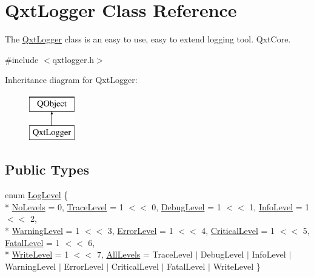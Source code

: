 \hypertarget{class_qxt_logger}{\section{Qxt\-Logger Class Reference}
\label{class_qxt_logger}
}


The \hyperlink{class_qxt_logger}{Qxt\-Logger} class is an easy to use, easy to extend logging tool.  Qxt\-Core.  




{\ttfamily \#include $<$qxtlogger.\-h$>$}

Inheritance diagram for Qxt\-Logger\-:\begin{figure}[H]
\begin{center}
\leavevmode
\includegraphics[height=2.000000cm]{class_qxt_logger}
\end{center}
\end{figure}
\subsection*{Public Types}
\begin{DoxyCompactItemize}
\item 
enum \hyperlink{class_qxt_logger_ac2071072628aa786466124cc32a324e7}{Log\-Level} \{ \\*
\hyperlink{class_qxt_logger_ac2071072628aa786466124cc32a324e7ac3f7ad50aaf29333c33202a15c9e7ae0}{No\-Levels} = 0, 
\hyperlink{class_qxt_logger_ac2071072628aa786466124cc32a324e7a33f411f2f3097d51fb9fb6e20a8c18ec}{Trace\-Level} = 1 $<$$<$ 0, 
\hyperlink{class_qxt_logger_ac2071072628aa786466124cc32a324e7a89e347a692fcf3d48566d2dc13c7cbad}{Debug\-Level} = 1 $<$$<$ 1, 
\hyperlink{class_qxt_logger_ac2071072628aa786466124cc32a324e7a59f1025f632113d92eafabd288584c9e}{Info\-Level} = 1 $<$$<$ 2, 
\\*
\hyperlink{class_qxt_logger_ac2071072628aa786466124cc32a324e7ab445c87d6b0f36ed9f04dd7eb2881694}{Warning\-Level} = 1 $<$$<$ 3, 
\hyperlink{class_qxt_logger_ac2071072628aa786466124cc32a324e7ae12693a703e8cb935f0a3475018794e7}{Error\-Level} = 1 $<$$<$ 4, 
\hyperlink{class_qxt_logger_ac2071072628aa786466124cc32a324e7a2c156f706b9ec2bb923a13092c3aeacf}{Critical\-Level} = 1 $<$$<$ 5, 
\hyperlink{class_qxt_logger_ac2071072628aa786466124cc32a324e7aa41338d4b9984abe4778ecbb9147bd96}{Fatal\-Level} = 1 $<$$<$ 6, 
\\*
\hyperlink{class_qxt_logger_ac2071072628aa786466124cc32a324e7ade626cc2db9b425ccdd66c491a16ba3d}{Write\-Level} = 1 $<$$<$ 7, 
\hyperlink{class_qxt_logger_ac2071072628aa786466124cc32a324e7a2ae573d97f9cbe265ec6397bca1383fc}{All\-Levels} = Trace\-Level $|$ Debug\-Level $|$ Info\-Level $|$ Warning\-Level $|$ Error\-Level $|$ Critical\-Level $|$ Fatal\-Level $|$ Write\-Level
 \}
\end{DoxyCompactItemize}
